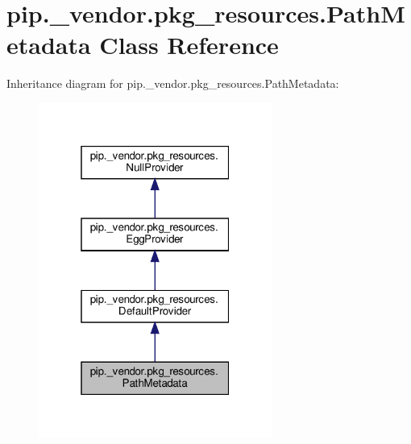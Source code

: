 \hypertarget{classpip_1_1__vendor_1_1pkg__resources_1_1PathMetadata}{}\section{pip.\+\_\+vendor.\+pkg\+\_\+resources.\+Path\+Metadata Class Reference}
\label{classpip_1_1__vendor_1_1pkg__resources_1_1PathMetadata}


Inheritance diagram for pip.\+\_\+vendor.\+pkg\+\_\+resources.\+Path\+Metadata\+:
\nopagebreak
\begin{figure}[H]
\begin{center}
\leavevmode
\includegraphics[width=217pt]{classpip_1_1__vendor_1_1pkg__resources_1_1PathMetadata__inherit__graph}
\end{center}
\end{figure}


